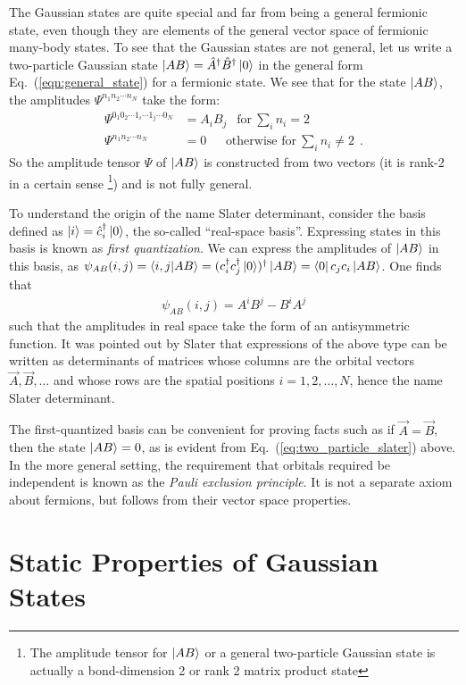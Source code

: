 \documentclass[aps, superscriptaddress, floatfix, onecolumn]{revtex4-2}
\begin{document}
The Gaussian states are quite special and far from being a general fermionic state, even though they are elements of the general vector space of fermionic many-body states. To see that the Gaussian states are not general, let us write a two-particle Gaussian state 
$\ket{AB} = \hat{A}^\dagger \hat{B}^\dagger \ket{0}$ in the general form Eq.~(\ref{eqn:general_state}) for a fermionic state.
We see that for the state $\ket{AB}$, the amplitudes $\Psi^{n_1 n_2 \cdots n_N}$ take the form:
\begin{align}
\Psi^{0_1 0_2 \cdots 1_i \cdots 1_j \cdots 0_N} & = A_i B_j \ \  \text{ for}\ \sum_i n_i = 2\\
\Psi^{n_1 n_2 \cdots n_N} & = 0 \ \ \ \ \  \ \ \text{otherwise for}\ \sum_i n_i \neq 2 \ \ .
\end{align}
So the amplitude tensor $\Psi$ of $\ket{AB}$ is constructed from two vectors (it is rank-2 in a certain sense \footnote{The amplitude tensor for $\ket{AB}$ or a general two-particle Gaussian state is actually a bond-dimension 2 or rank 2 matrix product state}) and is not fully general.

To understand the origin of the name Slater determinant, consider the basis defined as $\ket{i} = \hat{c}^\dagger_i \ket{0}$, the so-called ``real-space basis''.
Expressing states in this basis is known as \emph{first quantization}.
We can express the amplitudes of $\ket{AB}$ in this basis, as $\psi_{AB}(i,j) = \braket{i,j|AB} = (c^\dagger_i c^\dagger_j \ket{0})^\dagger \ket{AB} = \bra{0} c_j c_i \ket{AB}$. One finds that
\begin{align}
\psi_{AB}(i,j) =  A^i B^j - B^i A^j  \label{eq:two_particle_slater}
\end{align}
such that the amplitudes in real space take the form of an antisymmetric function.
It was pointed out by Slater that expressions of the above type can be written as determinants of matrices whose columns are the orbital vectors $\vec{A}, \vec{B}, \ldots$ and whose rows are the spatial positions $i=1,2, \ldots, N$, hence the name Slater determinant. 

The first-quantized basis can be convenient for proving facts such as if $\vec{A} = \vec{B}$, then the state $\ket{AB} = 0$, as is evident from Eq.~(\ref{eq:two_particle_slater}) above. In the more general setting, the requirement that orbitals required be independent is known as the \emph{Pauli exclusion principle}. It is not a separate axiom about fermions, but follows from their vector space properties.


\section{Static Properties of Gaussian States}
\end{document}
